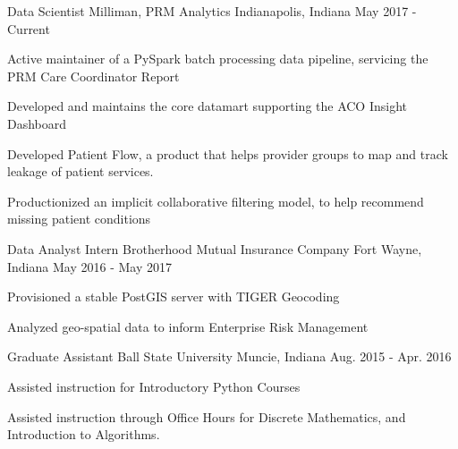 

\begin{cventries}

  \cventry
    {Data Scientist} %
    {Milliman, PRM Analytics} %
    {Indianapolis, Indiana} %
    {May 2017 - Current} %
    {
      \begin{cvitems} %
        \item {Active maintainer of a PySpark batch processing data pipeline, servicing the PRM Care Coordinator Report}
        \item {Developed and maintains the core datamart supporting the ACO Insight Dashboard}
        \item {Developed Patient Flow, a product that helps provider groups to map and track leakage of patient services.}
        \item {Productionized an implicit collaborative filtering model, to help recommend missing patient conditions}
      \end{cvitems}
    }

  \cventry
    {Data Analyst Intern} %
    {Brotherhood Mutual Insurance Company} %
    {Fort Wayne, Indiana} %
    {May 2016 - May 2017} %
    {
      \begin{cvitems} %
        \item {Provisioned a stable PostGIS server with TIGER Geocoding}
        \item {Analyzed geo-spatial data to inform Enterprise Risk Management}
      \end{cvitems}
    }

  \cventry
    {Graduate Assistant} %
    {Ball State University} %
    {Muncie, Indiana} %
    {Aug. 2015 - Apr. 2016} %
    {
      \begin{cvitems} %
        \item {Assisted instruction for Introductory Python Courses}
        \item {Assisted instruction through Office Hours for Discrete Mathematics, and Introduction to Algorithms.}
      \end{cvitems}
    }

\end{cventries}
